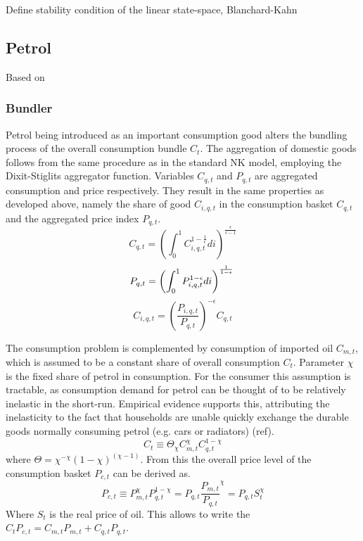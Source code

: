 \documentclass[12pt,a4paper,english]{article} %
\begin{document}
	Define stability condition of the linear state-space, Blanchard-Kahn

	\subsection{Petrol}
	Based on 
	
	
	\subsubsection{Bundler}
	Petrol being introduced as an important consumption good alters the bundling process of the overall consumption bundle $C_t$. 
	The aggregation of domestic goods follows from the same procedure as in the standard NK model, employing the Dixit-Stiglits aggregator function. Variables $C_{q,t}$ and $P_{q,t}$ are aggregated consumption and price respectively. They result in the same properties as developed above, namely the share of good $C_{i,q,t}$ in the consumption basket $C_{q,t}$ and the aggregated price index $P_{q,t}$. \\
	\begin{equation}
		C_{q,t} = \left( \int_{0}^{1} C_{i,q,t}^{1 - \frac{1}{\epsilon}} di \right)^{\frac{\epsilon}{\epsilon-1}} 
	\end{equation}
	\begin{equation}
		P_{q,t} = \left( \int_{0}^{1} P_{i,q,t}^{1 - \epsilon} di \right)^{\frac{1}{1-\epsilon}} \\
	\end{equation}
	\begin{equation}
		C_{i,q,t} = \left( \frac{P_{i,q,t}}{P_{q,t}} \right)^{-\epsilon} C_{q,t}
	\end{equation}
	
	The consumption problem is complemented by consumption of imported oil $C_{m,t}$, which is assumed to be a constant share of overall consumption $C_t$. Parameter $\chi$ is the fixed share of petrol in consumption. For the consumer this assumption is tractable, as consumption demand for petrol can be thought of to be relatively inelastic in the short-run. Empirical evidence supports this, attributing the inelasticity to the fact that households are unable quickly exchange the durable goods normally consuming petrol (e.g. cars or radiators) (ref). 
	\begin{equation}
		C_t \equiv \Theta_\chi C_{m,t}^\chi C_{q,t}^{1-\chi}
	\end{equation}
	where $\Theta = \chi^{-\chi}(1-\chi)^{(\chi-1)}$. From this the overall price level of the consumption basket $P_{c,t}$ can be derived as.
	\begin{equation}
		P_{c,t} \equiv P_{m,t}^\chi P_{q,t}^{1-\chi} 
			= P_{q,t} \frac{P_{m,t}}{P_{q,t}}^\chi
			= P_{q,t} S_t^\chi
	\end{equation}
	Where $S_t$ is the real price of oil. This allows to write the $C_t P_{c,t} = C_{m,t}P_{m,t} + C_{q,t}P_{q,t}$.
\end{document}
